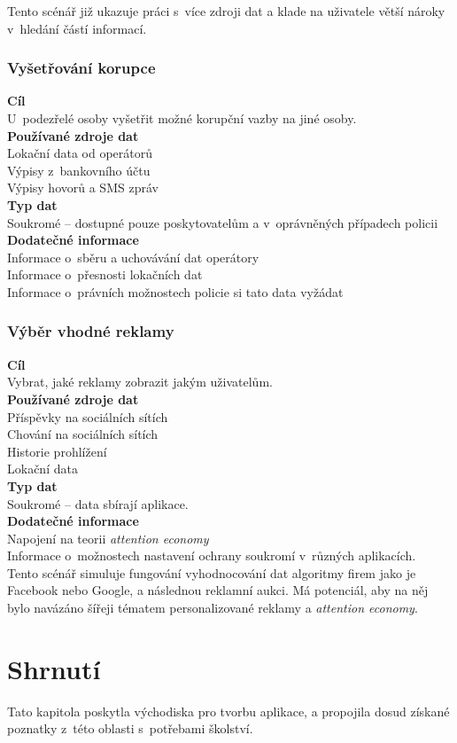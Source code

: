 Tento scénář již ukazuje práci s~více zdroji dat a klade na uživatele větší nároky v~hledání částí informací.


\subsubsection*{Vyšetřování korupce}
\textbf{Cíl}\\
U~podezřelé osoby vyšetřit možné korupční vazby na jiné osoby.\\
\textbf{Používané zdroje dat}\\
Lokační data od operátorů\\
Výpisy z~bankovního účtu\\
Výpisy hovorů a SMS zpráv\\
\textbf{Typ dat}\\
Soukromé -- dostupné pouze poskytovatelům a v~oprávněných případech policii\\
\textbf{Dodatečné informace}\\
Informace o~sběru a uchovávání dat operátory\\
Informace o~přesnosti lokačních dat\\
Informace o~právních možnostech policie si tato data vyžádat\\


\subsubsection*{Výběr vhodné reklamy} 
\textbf{Cíl}\\
Vybrat, jaké reklamy zobrazit jakým uživatelům.\\
\textbf{Používané zdroje dat}\\
Příspěvky na sociálních sítích\\
Chování na sociálních sítích\\
Historie prohlížení\\
Lokační data\\
\textbf{Typ dat}\\
Soukromé -- data sbírají aplikace.\\
\textbf{Dodatečné informace}\\
Napojení na teorii \textit{attention economy}\\
Informace o~možnostech nastavení ochrany soukromí v~různých aplikacích.\\

Tento scénář simuluje fungování vyhodnocování dat algoritmy firem jako je Facebook nebo Google, a následnou reklamní aukci. Má potenciál, aby na něj bylo navázáno šířeji tématem personalizované reklamy a \textit{attention economy}. 

\section*{Shrnutí}
Tato kapitola poskytla východiska pro tvorbu aplikace, a propojila dosud získané poznatky z~této oblasti s~potřebami školství.  